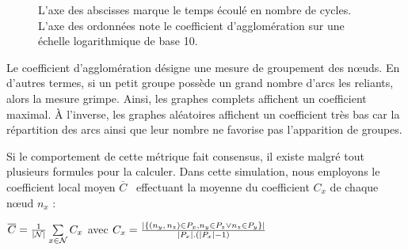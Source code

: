 \begin{figure}
  \centering
  \hspace{10pt}
  \caption{\label{net:fig:clustering}L'axe des abscisses marque le temps écoulé
    en nombre de cycles. L'axe des ordonnées note le coefficient d'agglomération
    sur une échelle logarithmique de base 10.}
\end{figure}

Le coefficient d'agglomération désigne une mesure de groupement des nœuds. En
d'autres termes, si un petit groupe possède un grand nombre d'arcs les reliants,
alors la mesure grimpe. Ainsi, les graphes complets affichent un coefficient
maximal. À l'inverse, les graphes aléatoires affichent un coefficient très bas
car la répartition des arcs ainsi que leur nombre ne favorise pas l'apparition
de groupes.

Si le comportement de cette métrique fait consensus, il existe malgré tout
plusieurs formules pour la calculer. Dans cette simulation, nous employons le
coefficient local moyen $\overline{C}$~\cite{watts1998collective} effectuant la
moyenne du coefficient $C_x$ de chaque nœud $n_x$ :
\begin{center}
  $\overline{C} = {1\over |\mathcal{N}|}\sum\limits_{x\in\mathcal{N}}C_x$ \hfill
  avec
  $C_x = {|\{ (n_y,\,n_z) \in P_x, n_y \in P_z \vee n_z \in P_y \}|\over
    |P_x|.(|P_x|-1)}$
\end{center}

